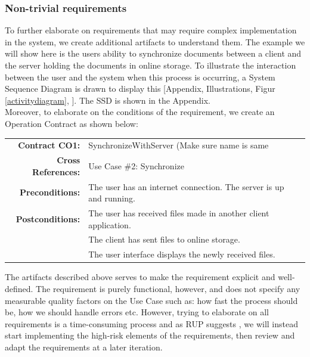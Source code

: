 \subsubsection{Non-trivial requirements}
To further elaborate on requirements that may require complex implementation in the system, we create additional artifacts to understand them. The example we will show here is the users ability to synchronize documents between a client and the server holding the documents in online storage. To illustrate the interaction between the user and the system when this process is occurring, a System Sequence Diagram is drawn to display this [Appendix, Illustrations, Figur \ref{activitydiagram}, \pageref{systemsequencediagram}]. The SSD is shown in the Appendix.\\
Moreover, to elaborate on the conditions of the requirement, we create an Operation Contract as shown below:\\
\begin{table}[ht]\centering
  \begin{tabularx}{\textwidth}{@{}rXXl@{}}\toprule
    \textbf{Contract CO1:} & SynchronizeWithServer (Make sure name is same\\
    \textbf{Cross References:} & Use Case \#2: Synchronize\\
    \textbf{Preconditions:} &  The user has an internet connection. The server is up and running.\\
    \textbf{Postconditions:} & The user has received files made in another client application.\\
    & The client has sent files to online storage.\\
    & The user interface displays the newly received files.\\
    \bottomrule
  \end{tabularx}
\end{table}
The artifacts described above serves to make the requirement explicit and well-defined. The requirement is purely functional, however, and does not specify any measurable quality factors on the Use Case such as: how fast the process should be, how we should handle errors etc. However, trying to elaborate on all requirements is a time-consuming process and as RUP suggests \cite[12.2 p.~196]{OOAD}, we will instead start implementing the high-risk elements of the requirements, then review and adapt the requirements at a later iteration. \\
